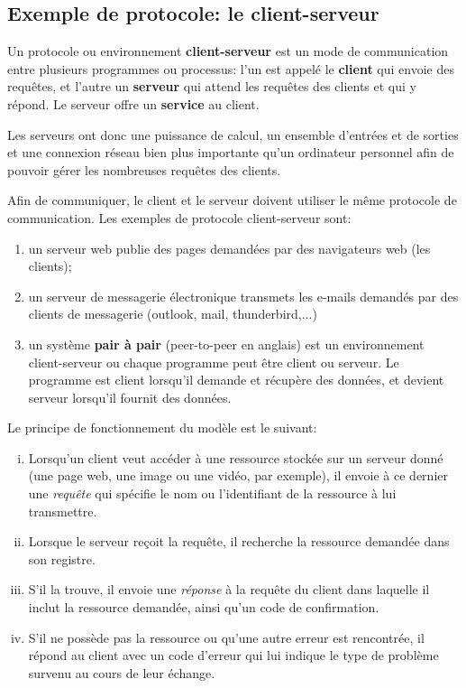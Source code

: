\documentclass[11pt, a4paper]{book}
\begin{document}
\subsection{Exemple de protocole: le client-serveur}

\begin{defi}
Un protocole ou environnement {\bf client-serveur} est un mode de communication entre plusieurs programmes ou processus: l'un est appelé le {\bf client} qui envoie des requêtes, et l'autre un {\bf serveur} qui attend les requêtes des clients et qui y répond. Le serveur offre un {\bf service} au client. 
\end{defi}

Les serveurs ont donc une puissance de calcul, un ensemble d'entrées et de sorties et une connexion réseau bien plus importante qu'un ordinateur personnel afin de pouvoir gérer les nombreuses requêtes des clients.

Afin de communiquer, le client et le serveur doivent utiliser le même protocole de communication. Les exemples de protocole client-serveur sont:
\begin{enumerate}
\item un serveur web publie des pages demandées par des navigateurs web (les clients);
\item un serveur de messagerie électronique transmets les e-mails demandés par des clients de messagerie (outlook, mail, thunderbird,...)
\item un système {\bf pair à pair } (peer-to-peer en anglais) est un environnement client-serveur ou chaque programme peut être client ou serveur. Le programme est client lorsqu'il demande et récupère des données, et devient serveur lorsqu'il fournit des données.
\end{enumerate}

\vskip1cm

Le principe de fonctionnement du modèle est le suivant:
\begin{enumerate}[i)]
\item Lorsqu'un client veut accéder à une ressource stockée sur un serveur donné (une page web, une image ou une vidéo, par exemple), il envoie à ce dernier une {\it requête} qui spécifie  le nom
ou l'identifiant de la ressource à lui transmettre.
\item Lorsque le serveur reçoit la requête, il recherche la ressource demandée dans son registre.
\item S'il la trouve, il envoie une {\it réponse} à la requête du client dans laquelle il inclut la ressource demandée, ainsi qu'un code de confirmation.
\item S'il ne possède pas la ressource ou qu'une autre erreur est rencontrée, il répond au client avec un code d'erreur qui lui indique le type de problème survenu au cours de leur échange.
\end{enumerate}
\end{document}
